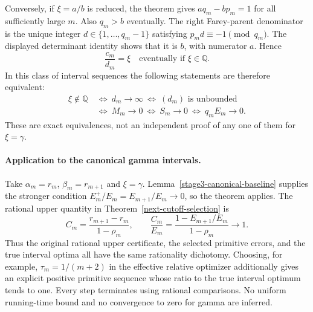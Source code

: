 \documentclass[11pt,a4paper]{article}
\theoremstyle{definition}
\theoremstyle{remark}
\begin{document}
Conversely, if $\xi=a/b$ is reduced, the theorem gives
$aq_m-bp_m=1$ for all sufficiently large $m$. Also $q_m>b$ eventually.
The right Farey-parent denominator is the unique integer
$d\in\{1,\ldots,q_m-1\}$ satisfying $p_md\equiv-1\pmod{q_m}$.
The displayed determinant identity shows that it is $b$, with numerator
$a$. Hence
\begin{equation}\label{unified-selection-parent-stabilization}
 \frac{c_m}{d_m}=\xi\quad\text{eventually if }\xi\in\mathbb Q.
\end{equation}
In this class of interval sequences the following statements are
therefore equivalent:
\[
 \begin{aligned}
 \xi\notin\mathbb Q
 &\ \Longleftrightarrow\ d_m\to\infty
    \ \Longleftrightarrow\ (d_m)\text{ is unbounded}\\
 &\ \Longleftrightarrow\ M_m\to0
    \ \Longleftrightarrow\ S_m\to0
    \ \Longleftrightarrow\ q_mE_m\to0.
 \end{aligned}
\]
These are exact equivalences, not an independent proof of any one of
them for $\xi=\gamma$.

\paragraph{Application to the canonical gamma intervals.}
Take $\alpha_m=r_m$, $\beta_m=r_{m+1}$ and $\xi=\gamma$.
Lemma~\ref{stage3-canonical-baseline} supplies the stronger condition
$E_m^+/E_m=E_{m+1}/E_m\to0$, so the theorem applies. The rational upper
quantity in Theorem~\ref{next-cutoff-selection} is
\[
 C_m=\frac{r_{m+1}-r_m}{1-\rho_m},\qquad
 \frac{C_m}{E_m}
 =\frac{1-E_{m+1}/E_m}{1-\rho_m}\longrightarrow1.
\]
Thus the original rational upper certificate, the selected primitive
errors, and the true interval optima all have the same rationality
dichotomy. Choosing, for example, $\tau_m=1/(m+2)$ in the effective
relative optimizer additionally gives an explicit positive primitive
sequence whose ratio to the true interval optimum tends to one.
Every step terminates using rational comparisons. No uniform running-time
bound and no convergence to zero for gamma are inferred.
\end{document}

